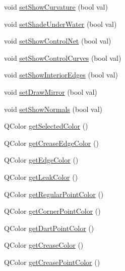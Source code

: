 \begin{DoxyCompactItemize}
\item 
void \hyperlink{classShipCAD_1_1SubdivisionSurface_abf6fe62614aadf1cdd4f26fb4d3fc441}{set\-Show\-Curvature} (bool val)
\item 
void \hyperlink{classShipCAD_1_1SubdivisionSurface_a797d9b728f794b7f2fc61f1c51dacc06}{set\-Shade\-Under\-Water} (bool val)
\item 
void \hyperlink{classShipCAD_1_1SubdivisionSurface_af5380f1a7932b23a5fbf400c85542381}{set\-Show\-Control\-Net} (bool val)
\item 
void \hyperlink{classShipCAD_1_1SubdivisionSurface_aabf54bc152176697a82c0eb6e47f5981}{set\-Show\-Control\-Curves} (bool val)
\item 
void \hyperlink{classShipCAD_1_1SubdivisionSurface_a5a4e5acd1bfc4d845d28513dd2dbc0cd}{set\-Show\-Interior\-Edges} (bool val)
\item 
void \hyperlink{classShipCAD_1_1SubdivisionSurface_a3605a409a102a18714e9ad7d028e7f33}{set\-Draw\-Mirror} (bool val)
\item 
void \hyperlink{classShipCAD_1_1SubdivisionSurface_a678530145785bd366316b35d2bd0ab67}{set\-Show\-Normals} (bool val)
\item 
Q\-Color \hyperlink{classShipCAD_1_1SubdivisionSurface_a4d307277e2a96d86b3d3e7788c2aac0a}{get\-Selected\-Color} ()
\item 
Q\-Color \hyperlink{classShipCAD_1_1SubdivisionSurface_a50b5868db7d2c5d6cce75fa2b52be60f}{get\-Crease\-Edge\-Color} ()
\item 
Q\-Color \hyperlink{classShipCAD_1_1SubdivisionSurface_a40dd77bdff5cf86b4a6eca7ff5a2e643}{get\-Edge\-Color} ()
\item 
Q\-Color \hyperlink{classShipCAD_1_1SubdivisionSurface_ac3131c3badeb6b11cb8a5ec5ceef0961}{get\-Leak\-Color} ()
\item 
Q\-Color \hyperlink{classShipCAD_1_1SubdivisionSurface_afdf406376421eb43a34f53392fbcf5b1}{get\-Regular\-Point\-Color} ()
\item 
Q\-Color \hyperlink{classShipCAD_1_1SubdivisionSurface_af64e951c070d6c88f70c399bc13809d1}{get\-Corner\-Point\-Color} ()
\item 
Q\-Color \hyperlink{classShipCAD_1_1SubdivisionSurface_ac355dfe572889755c24d1c8cd3145aea}{get\-Dart\-Point\-Color} ()
\item 
Q\-Color \hyperlink{classShipCAD_1_1SubdivisionSurface_a6aad1f3725f8033bb85403a01c252006}{get\-Crease\-Color} ()
\item 
Q\-Color \hyperlink{classShipCAD_1_1SubdivisionSurface_a82c8cb1c6c448be7554bcb42e0099660}{get\-Crease\-Point\-Color} ()

\end{DoxyCompactItemize}
